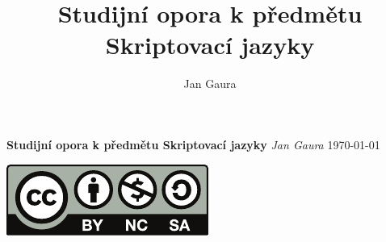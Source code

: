 \documentclass[10pt,oneside]{book}
\title{Studijní opora k předmětu Skriptovací jazyky}
\author{Jan Gaura}
\def\mtitle{Studijní opora k předmětu Skriptovací jazyky}
\def\mauthor{Jan Gaura}
\begin{document}
\newcommand{\rdk}[1]{\texttt{#1}}
\newcommand{\kod}[1]{\textbf{\texttt{#1}}}


\begin{titlepage}
   \begin{center}
      \huge\textbf{\mtitle}
      \vskip0.8cm
      \Large\textit{\mauthor}
      \normalsize{\today}
   \end{center}

   \begin{center}
        \includegraphics{img/by-nc-sa}
    \end{center}

\end{titlepage}

\newpage


\tableofcontents

\newpage















%

%



\printindex       %
\printindex[cmnd] %
\end{document}
